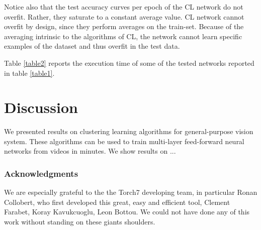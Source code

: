 \documentclass{article} %
\begin{document}
Notice also that the test accuracy curves per epoch of the CL network do not overfit. Rather, they saturate to a constant average value. CL network cannot overfit by design, since they perform averages on the train-set. Because of the averaging intrinsic to the algorithms of CL, the network cannot learn specific examples of the dataset and thus overfit in the test data.

%

Table \ref{table2} reports the execution time of some of the tested networks reported in table \ref{table1}.



\section{Discussion}

We presented results on clustering learning algorithms for general-purpose vision system. These algorithms can be used to train multi-layer feed-forward neural networks from videos in minutes. We show results on ...



%


\subsubsection*{Acknowledgments}
We are especially grateful to the the Torch7 developing team, in particular Ronan Collobert, who first developed this great, easy and efficient tool, Clement Farabet, Koray Kavukcuoglu, Leon Bottou. We could not have done any of this work without standing on these giants shoulders.



\end{document}
